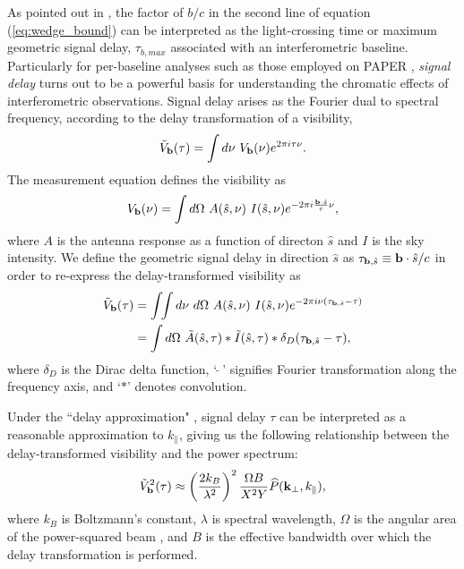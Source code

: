 \documentclass[11pt]{article}
\newcommand{\kvec}{{\bf k}}
\newcommand{\bvec}{{\bf b}}
\newcommand{\shat}{{\hat s}}
\newcommand{\kvpr}{{\kvec_\perp}}
\newcommand{\kpl}{{k_\parallel}}
\begin{document}
As pointed out in \citet{parsons_et_al2012b}, the factor of $b/c$ in the
second line of equation (\ref{eq:wedge_bound}) can be interpreted as the light-crossing time
or maximum geometric signal delay, $\tau_{b,max}$ associated with an interferometric baseline.  
Particularly for per-baseline
analyses such as those
employed on PAPER \citep{parsons_et_al2014,jacobs_et_al2015,moore_et_al2015,ali_et_al2015},
{\it signal delay} turns out to be a 
powerful basis for understanding the chromatic effects of interferometric observations.
Signal delay arises as the Fourier dual to spectral frequency, according to the delay
transformation of a visibility,
\begin{equation}
\tilde V_\bvec(\tau)=\int{d\nu~V_\bvec(\nu) e^{2\pi i\tau\nu}}.
\end{equation}
The measurement equation defines the visibility as
\begin{equation}
V_\bvec(\nu)=\int{d\Omega~A(\shat,\nu)~I(\shat,\nu) e^{-2\pi i\frac{\bvec\cdot\shat}{c}\nu}},
\label{eq:meas_eq}
\end{equation}
where $A$ is the antenna response as a function of directon $\shat$ and $I$ is the sky intensity.
We define the geometric signal delay in direction $\shat$ as $\tau_{\bvec,\shat}\equiv\bvec\cdot\shat/c$
in order to re-express the delay-transformed visibility as
\begin{align}
\tilde V_\bvec(\tau)&=\int\!\!\int{d\nu~d\Omega~A(\shat,\nu)~I(\shat,\nu) e^{-2\pi i\nu(\tau_{\bvec,\shat}-\tau)}}\nonumber\\
&=\int{d\Omega~\tilde A(\shat,\tau)*\tilde I(\shat,\tau)*\delta_D(\tau_{\bvec,\shat}-\tau)},
\end{align}
where $\delta_D$ is the Dirac delta function, `$~\tilde{}~$' signifies Fourier transformation along
the frequency axis, and `$*$' denotes convolution.

Under the ``delay approximation" \citep{parsons_et_al2012b},
signal delay $\tau$ can be interpreted as a reasonable approximation to $\kpl$, giving us the following relationship
between the delay-transformed visibility and the power spectrum:
\begin{equation}
\tilde V_\bvec^2(\tau)\approx\left(\frac{2k_B}{\lambda^2}\right)^2\frac{\Omega B}{X^2Y}\widehat P(\kvpr,\kpl),
\label{eq:v2_to_pk}
\end{equation}
where $k_B$ is Boltzmann's constant, $\lambda$ is spectral wavelength, $\Omega$ is the angular area of the power-squared
beam \citep{parsons_et_al2014}, and $B$ is the effective bandwidth over which the delay transformation is performed.
\end{document}
